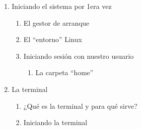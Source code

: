 \documentclass[12pt, letter-paper]{article}
\begin{document}
\begin{enumerate}
\item Iniciando el sistema por 1era vez
  \begin{enumerate}
  \item El gestor de arranque
  \item El ``entorno'' Linux
  \item Iniciando sesión con nuestro usuario
    \begin{enumerate}
    \item La carpeta ``home''
    \end{enumerate}
  \end{enumerate}
  
\item La terminal
  \begin{enumerate}
  \item ¿Qué es la terminal y para qué sirve?
  \item Iniciando la terminal
  \end{enumerate}
  

\end{enumerate}
\end{document}
